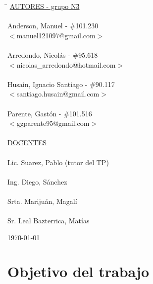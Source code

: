 \begin{titlepage}
		\begin{tabbing}
			\hspace{2cm}\=\+
			\underline{AUTORES - grupo N3}\hspace{-1cm}\=\+\hspace{1cm}\=\hspace{6cm}\=\\
			\\
			Anderson, Manuel			\>\>- \#101.230\\
			\>\footnotesize{$<$manuel121097@gmail.com$>$}\\
			\\
			Arredondo, Nicolás			\>\>- \#95.618\\
			\>\footnotesize{$<$nicolas\_arredondo@hotmail.com$>$}\\
			\\
			Husain, Ignacio Santiago	\>\>- \#90.117\\
			\>\footnotesize{$<$santiago.husain@gmail.com$>$}\\
			\\
			Parente, Gastón			 	\>\>- \#101.516 \\
			\>\footnotesize{$<$ggparente95@gmail.com$>$}\\
			\\
			\<\underline{DOCENTES}\\
			\\
			Lic. Suarez, Pablo (tutor del TP)\\
			\\
			Ing. Diego, Sánchez \\
			\\
			Srta. Marijuán, Magalí\\
			\\
			Sr. Leal Bazterrica, Matías
		\end{tabbing}
		
		
		\today
		
	\end{titlepage}
	
	\clearpage
	\tableofcontents
	\clearpage
	\section{Objetivo del trabajo}
	
